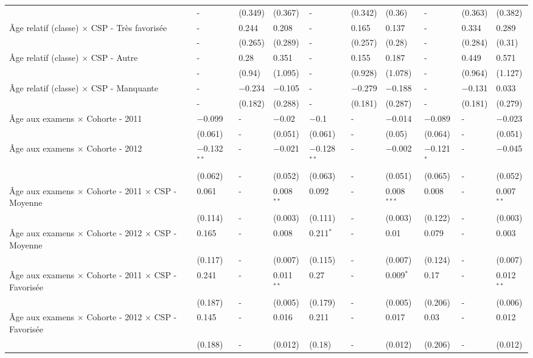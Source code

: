 \documentclass[
]{book}
\begin{document}
\begin{landscape}
\begin{ThreePartTable}
\begin{longtable}[t]{llllllllll}
 & - & (0.349) & (0.367) & - & (0.342) & (0.36) & - & (0.363) & (0.382)\\
Âge relatif (classe) $\times$ CSP - Très favorisée & - & 0.244 & 0.208 & - & 0.165 & 0.137 & - & 0.334 & 0.289\\
 & - & (0.265) & (0.289) & - & (0.257) & (0.28) & - & (0.284) & (0.31)\\
Âge relatif (classe) $\times$ CSP - Autre & - & 0.28 & 0.351 & - & 0.155 & 0.187 & - & 0.449 & 0.571\\
 & - & (0.94) & (1.095) & - & (0.928) & (1.078) & - & (0.964) & (1.127)\\
Âge relatif (classe) $\times$ CSP - Manquante & - & $-$0.234 & $-$0.105 & - & $-$0.279 & $-$0.188 & - & $-$0.131 & 0.033\\
 & - & (0.182) & (0.288) & - & (0.181) & (0.287) & - & (0.181) & (0.279)\\
Âge aux examens $\times$ Cohorte - 2011 & $-$0.099 & - & $-$0.02 & $-$0.1 & - & $-$0.014 & $-$0.089 & - & $-$0.023\\
 & (0.061) & - & (0.051) & (0.061) & - & (0.05) & (0.064) & - & (0.051)\\
Âge aux examens $\times$ Cohorte - 2012 & $-$0.132$^{**}$ & - & $-$0.021 & $-$0.128$^{**}$ & - & $-$0.002 & $-$0.121$^{*}$ & - & $-$0.045\\
 & (0.062) & - & (0.052) & (0.063) & - & (0.051) & (0.065) & - & (0.052)\\
Âge aux examens $\times$ Cohorte - 2011 $\times$ CSP - Moyenne & 0.061 & - & 0.008$^{**}$ & 0.092 & - & 0.008$^{***}$ & 0.008 & - & 0.007$^{**}$\\
 & (0.114) & - & (0.003) & (0.111) & - & (0.003) & (0.122) & - & (0.003)\\
Âge aux examens $\times$ Cohorte - 2012 $\times$ CSP - Moyenne & 0.165 & - & 0.008 & 0.211$^{*}$ & - & 0.01 & 0.079 & - & 0.003\\
 & (0.117) & - & (0.007) & (0.115) & - & (0.007) & (0.124) & - & (0.007)\\
Âge aux examens $\times$ Cohorte - 2011 $\times$ CSP - Favorisée & 0.241 & - & 0.011$^{**}$ & 0.27 & - & 0.009$^{*}$ & 0.17 & - & 0.012$^{**}$\\
 & (0.187) & - & (0.005) & (0.179) & - & (0.005) & (0.206) & - & (0.006)\\
Âge aux examens $\times$ Cohorte - 2012 $\times$ CSP - Favorisée & 0.145 & - & 0.016 & 0.211 & - & 0.017 & 0.03 & - & 0.012\\
 & (0.188) & - & (0.012) & (0.18) & - & (0.012) & (0.206) & - & (0.012)\\

\end{longtable}
\end{ThreePartTable}
\end{landscape}
\end{document}
